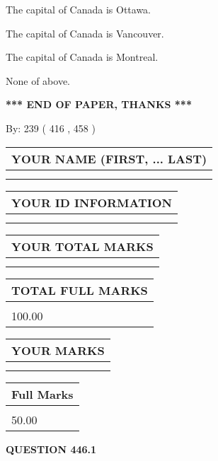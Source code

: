 \documentclass[12pt]{article}
\begin{document}
  
 
 
The capital of Canada is Ottawa.
 
 
The capital of Canada is Vancouver.
 
 
The capital of Canada is Montreal.
 
 
 None of above.
 
 
   
   
\vspace{1.0in} 
{\textbf{\large{ *** END OF PAPER, THANKS *** }}} 
   
   
\hspace{1.0in} By: 
 239 ( 416 ,  458 )
   
   
   
   
\newpage 
\setcounter{page}{ 
   446001 } 
   
   
   
   
\noindent\begin{tabular}{|l|}
\hline
YOUR NAME (FIRST, ... LAST)  \\
\hline
 \\ 
 \\ 
\hline
\end{tabular}
\hspace{0.05in} \begin{tabular}{|l|}
\hline
 YOUR   ID   INFORMATION  \\
\hline
 \\ 
 \\ 
\hline
\end{tabular}
   
   
\vspace{0.2in}\noindent\begin{tabular}{|l|}
\hline
YOUR TOTAL MARKS  \\
\hline
 \\ 
 \\ 
\hline
\end{tabular}
\hspace{0.05in} \begin{tabular}{|l|}
\hline
TOTAL FULL MARKS  \\
\hline
 \\ 
100.00 \\
\hline
\end{tabular}
  
\vspace{0.2in}
  
\noindent\begin{tabular}{|l|}
\hline
 YOUR MARKS  \\
\hline
 \\ 
 \\ 
\hline
\end{tabular}
\hspace{0.05in} \begin{tabular}{|l|}
\hline
 Full Marks  \\
\hline
 \\ 
50.00 \\
\hline
\end{tabular}
{\textbf{\Large{QUESTION
446.1 
}}}
  
\end{document}
